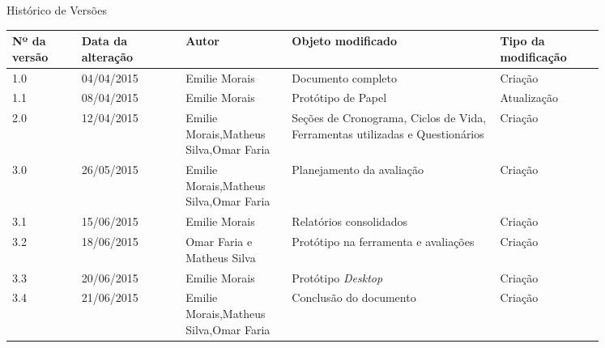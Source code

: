 \begin{center}
 
{\LARGE Histórico de Versões}
\end{center}


\begin{table*}[!h]
\centering
  \begin{tabular}{p{0.10\linewidth}p{0.15\linewidth}p{0.15\linewidth}p{0.30\linewidth}p{0.15\linewidth}}
  \hline
  Nº da versão&Data da alteração&Autor&Objeto modificado&Tipo da modificação\\
  \hline

   1.0&04/04/2015&Emilie Morais&Documento completo&Criação\\
   1.1&08/04/2015&Emilie Morais&Protótipo de Papel&Atualização\\
   2.0&12/04/2015&Emilie Morais,Matheus Silva,Omar Faria& Seções de Cronograma, Ciclos de Vida, Ferramentas utilizadas e Questionários&Criação\\
   3.0&26/05/2015&Emilie Morais,Matheus Silva,Omar Faria& Planejamento da avaliação&Criação\\
   3.1&15/06/2015&Emilie Morais&Relatórios consolidados&Criação\\
   3.2&18/06/2015&Omar Faria e Matheus Silva&Protótipo na ferramenta e avaliações&Criação\\
   3.3&20/06/2015&Emilie Morais&Protótipo \textit{Desktop}&Criação\\
   3.4&21/06/2015&Emilie Morais,Matheus Silva,Omar Faria&Conclusão do documento&Criação\\
  \hline
  \end{tabular}
\end{table*}
